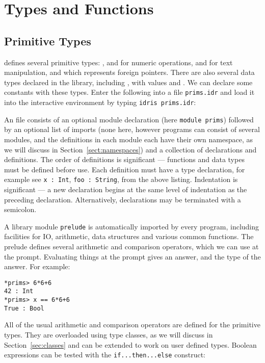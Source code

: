 \section{Types and Functions}

\subsection{Primitive Types}

\Idris{} defines several primitive types: ,  and  for numeric operations,  and  for text manipulation, and  which represents foreign pointers.
There are also several data types declared in the library, including , with values  and .
We can declare some constants with these types.
Enter the following into a file \texttt{prims.idr} and load it into the \Idris{} interactive environment by typing \texttt{idris prims.idr}:


\noindent
An \Idris{} file consists of an optional module declaration (here \texttt{module prims}) followed by an optional list of imports (none here, however \Idris{} programs can consist of several modules, and the definitions in each module each have their own namespace, as we will discuss in Section~\ref{sect:namespaces}) and a collection of declarations and definitions.
The order of definitions is significant --- functions and data types must be defined before use.
Each definition must have a type declaration, for example see \texttt{x : Int}, \texttt{foo : String}, from the above listing.
Indentation is significant --- a new declaration begins at the same level of indentation as the preceding declaration.
Alternatively, declarations may be terminated with a semicolon.

A library module \texttt{prelude} is automatically imported by every \Idris{} program, including facilities for IO, arithmetic, data structures and various common functions.
The prelude defines several arithmetic and comparison operators, which we can use at the prompt. Evaluating things at the prompt gives an answer, and the type of the answer.
For example:

\begin{lstlisting}[style=stdout]
*prims> 6*6+6
42 : Int
*prims> x == 6*6+6
True : Bool
\end{lstlisting}

\noindent
All of the usual arithmetic and comparison operators are defined for the primitive types.
They are overloaded using type classes, as we will discuss in Section~\ref{sec:classes} and can be extended to work on user defined types.
Boolean expressions can be tested with the \texttt{if...then...else} construct:


